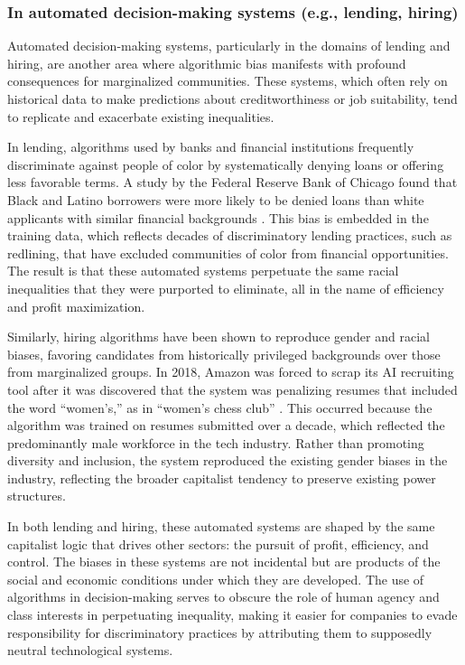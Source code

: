 \subsubsection{In automated decision-making systems (e.g., lending, hiring)}

Automated decision-making systems, particularly in the domains of lending and hiring, are another area where algorithmic bias manifests with profound consequences for marginalized communities. These systems, which often rely on historical data to make predictions about creditworthiness or job suitability, tend to replicate and exacerbate existing inequalities.

In lending, algorithms used by banks and financial institutions frequently discriminate against people of color by systematically denying loans or offering less favorable terms. A study by the Federal Reserve Bank of Chicago found that Black and Latino borrowers were more likely to be denied loans than white applicants with similar financial backgrounds \cite[pp.~55-58]{bartlett2021}. This bias is embedded in the training data, which reflects decades of discriminatory lending practices, such as redlining, that have excluded communities of color from financial opportunities. The result is that these automated systems perpetuate the same racial inequalities that they were purported to eliminate, all in the name of efficiency and profit maximization.

Similarly, hiring algorithms have been shown to reproduce gender and racial biases, favoring candidates from historically privileged backgrounds over those from marginalized groups. In 2018, Amazon was forced to scrap its AI recruiting tool after it was discovered that the system was penalizing resumes that included the word “women’s,” as in “women’s chess club” \cite[pp.~41-43]{krivoruchko2021}. This occurred because the algorithm was trained on resumes submitted over a decade, which reflected the predominantly male workforce in the tech industry. Rather than promoting diversity and inclusion, the system reproduced the existing gender biases in the industry, reflecting the broader capitalist tendency to preserve existing power structures.

In both lending and hiring, these automated systems are shaped by the same capitalist logic that drives other sectors: the pursuit of profit, efficiency, and control. The biases in these systems are not incidental but are products of the social and economic conditions under which they are developed. The use of algorithms in decision-making serves to obscure the role of human agency and class interests in perpetuating inequality, making it easier for companies to evade responsibility for discriminatory practices by attributing them to supposedly neutral technological systems.

